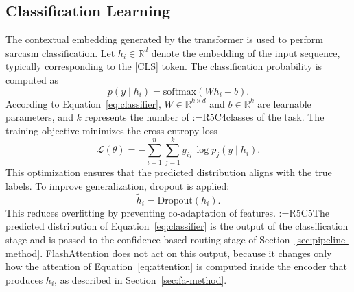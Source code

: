 \documentclass[a4paper,fleqn]{cas-sc}
\makeatletter
\newif\iftracked
\newcommand{\rv@setcolour}[1]{%
  \IfStrEq{#1}{R7C7}{\color{rvEdit}}{%
    \IfSubStr{#1}{R5}{\IfSubStr{#1}{R7}{\color{rvBoth}}{\color{rvFive}}}{\color{rvSeven}}}}
\newcommand{\rv@tag}[1]{\textsuperscript{\sffamily\bfseries\scriptsize[\StrSubstitute{#1}{,}{, }]}\,}
\newcommand{\rv@recordone}[1]{%
  \edef\rv@i{#1}%
  \ifcsdef{rv@n@\rv@i}{}{\csgdef{rv@n@\rv@i}{0}}%
  \csxdef{rv@n@\rv@i}{\the\numexpr\csuse{rv@n@\rv@i}+1\relax}%
  \begingroup\edef\@currentlabel{\rv@i}\label{rv:\rv@i:\csuse{rv@n@\rv@i}}\endgroup}
\newcommand{\rv@record}[1]{\@for\rv@id:=#1\do{\expandafter\rv@recordone\expandafter{\rv@id}}}
\DeclareRobustCommand{\rcrep}[3]{\rv@record{#1}\iftracked{\rv@setcolour{#1}\rv@tag{#1}\rv@strike{#2} #3}\else#3\fi}
\makeatother
\begin{document}
\subsection{Classification Learning}
The contextual embedding generated by the transformer is used to perform sarcasm classification. Let $h_i \in \mathbb{R}^{d}$ denote the embedding of the input sequence, typically corresponding to the [CLS] token. The classification probability is computed as
\begin{equation}
p(y \mid h_i) = \mathrm{softmax}(W h_i + b).
\label{eq:classifier}
\end{equation}
According to Equation~\eqref{eq:classifier}, $W \in \mathbb{R}^{k\times d}$ and $b \in \mathbb{R}^{k}$ are learnable parameters, and $k$ represents the number of \rcrep{R5C4}{sarcasm classes}{classes of the task}. The training objective minimizes the cross-entropy loss
\begin{equation}
\mathcal{L}(\theta) = -\sum_{i=1}^{n}\sum_{j=1}^{k} y_{ij}\,\log p_j(y \mid h_i).
\label{eq:cls-loss}
\end{equation}
This optimization ensures that the predicted distribution aligns with the true labels. To improve generalization, dropout is applied:
\begin{equation}
\tilde{h}_i = \mathrm{Dropout}(h_i).
\label{eq:dropout}
\end{equation}
This reduces overfitting by preventing co-adaptation of features. \rcrep{R5C5}{The classification output produced in this stage is then forwarded to the efficiency optimization layer, ensuring that both accuracy and computational performance are maintained.}{The predicted distribution of Equation~\eqref{eq:classifier} is the output of the classification stage and is passed to the confidence-based routing stage of Section~\ref{sec:pipeline-method}. FlashAttention does not act on this output, because it changes only how the attention of Equation~\eqref{eq:attention} is computed inside the encoder that produces $h_i$, as described in Section~\ref{sec:fa-method}.}
\end{document}
